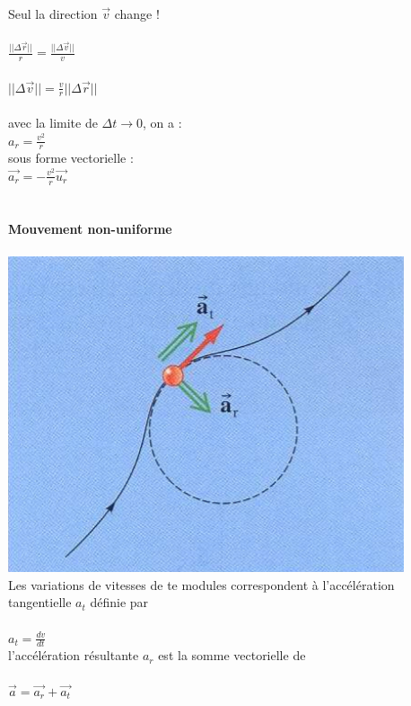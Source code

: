 \documentclass[]{article}
\begin{document}
Seul la direction $\overrightarrow{v}$ change !\\\\
\indent \indent$\frac{||\Delta \overrightarrow{r}||}{r} = \frac{||\Delta \overrightarrow{v}||}{v}$\\\\
\indent \indent$||\Delta \overrightarrow{v}|| = \frac{v}{r}||\Delta \overrightarrow{r}||$\\\\

avec la limite de $\Delta t \to 0$, on a :\\
\indent \indent $a_r = \frac{v^2}{r}$\\

sous forme vectorielle :\\
\indent \indent $\overrightarrow{a_r} = -\frac{v^2}{r}\overrightarrow{u_r}$\\\\\\
\newpage
\noindent \textbf{Mouvement non-uniforme}\\\\

\includegraphics[scale=0.65]{MNU}\\

Les variations de vitesses de te modules correspondent à l'accélération tangentielle $a_t$ définie par\\\\
\indent \indent $a_t = \frac{dv}{dt}$\\

l'accélération résultante $a_r$ est la somme vectorielle de\\\\
\indent \indent $\overrightarrow{a} = \overrightarrow{a_r} + \overrightarrow{a_t}$\\
\end{document}
